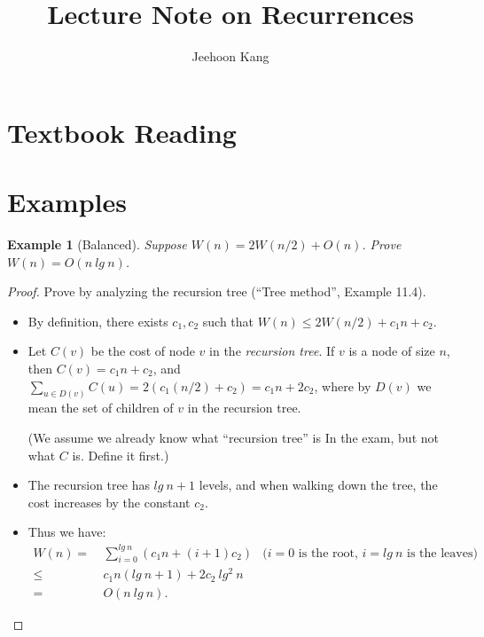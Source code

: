 \documentclass[11pt,a4paper,oneside,microtype,nokorean]{oblivoir}
\newtheorem{example}{Example}
\begin{document}
\title{Lecture Note on Recurrences}
\author{Jeehoon Kang}
\maketitle

\section{Textbook Reading}




\section{Examples}


\begin{example}[Balanced] Suppose $W(n) = 2W(n/2) + O(n)$.  Prove $W(n) = O(n~lg~n)$.
\end{example}

\begin{proof}
  Prove by analyzing the recursion tree (``Tree method'', Example 11.4).

  \begin{itemize}
  \item By definition, there exists $c_1,c_2$ such that $W(n) \le 2W(n/2) + c_1 n + c_2.$
  \item Let $C(v)$ be the cost of node $v$ in the \emph{recursion tree}.  If $v$ is a node of size
    $n$, then $C(v) = c_1 n + c_2$, and
    $\sum_{u \in D(v)} C(u) = 2(c_1 (n/2) + c_2) = c_1 n + 2 c_2$, where by $D(v)$ we mean the set
    of children of $v$ in the recursion tree.

    (We assume we already know what ``recursion tree'' is In the exam, but not what $C$ is.  Define
    it first.)
  \item The recursion tree has $lg~n + 1$ levels, and when walking down the tree, the cost increases
    by the constant $c_2$.
  \item Thus we have:
    \begin{align*}
      W(n)
      = &~ \sum_{i=0}^{lg~n} (c_1 n + (i+1) c_2) & \mbox{($i=0$ is the root, $i=lg~n$ is the
                                                   leaves)} \\
      \le &~ c_1 n (lg~n + 1) + 2 c_2~lg^2~n \\
      = &~ O(n~lg~n).
    \end{align*}
  \end{itemize}
\end{proof}
\end{document}

